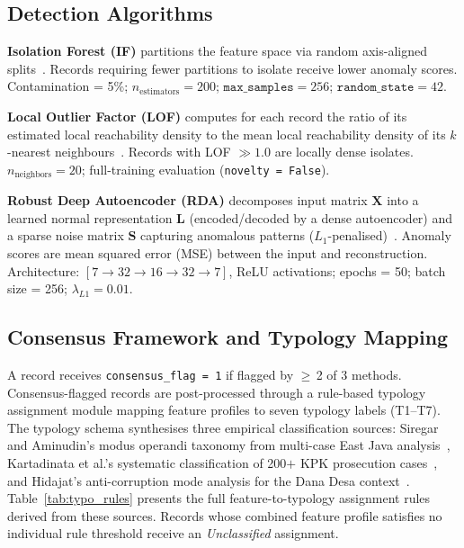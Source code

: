 \documentclass[3p,times,procedia]{elsarticle}
\begin{document}
\subsection{Detection Algorithms}

\textbf{Isolation Forest (IF)} partitions the feature space via random axis-aligned splits~\cite{ref19,ref20}. Records requiring fewer partitions to isolate receive lower anomaly scores. Contamination = 5\%; $n_{\text{estimators}} = 200$; $\texttt{max\_samples} = 256$; $\texttt{random\_state} = 42$.

\textbf{Local Outlier Factor (LOF)} computes for each record the ratio of its estimated local reachability density to the mean local reachability density of its $k$-nearest neighbours~\cite{ref25}. Records with LOF $\gg 1.0$ are locally dense isolates. $n_{\text{neighbors}} = 20$; full-training evaluation (\texttt{novelty = False}).

\textbf{Robust Deep Autoencoder (RDA)} decomposes input matrix $\mathbf{X}$ into a learned normal representation $\mathbf{L}$ (encoded/decoded by a dense autoencoder) and a sparse noise matrix $\mathbf{S}$ capturing anomalous patterns ($L_1$-penalised)~\cite{ref34}. Anomaly scores are mean squared error (MSE) between the input and reconstruction. Architecture: $[7 \to 32 \to 16 \to 32 \to 7]$, ReLU activations; epochs = 50; batch size = 256; $\lambda_{L1} = 0.01$.

\subsection{Consensus Framework and Typology Mapping}

A record receives \texttt{consensus\_flag = 1} if flagged by $\geq$\,2 of 3 methods. Consensus-flagged records are post-processed through a rule-based typology assignment module mapping feature profiles to seven typology labels (T1--T7). The typology schema synthesises three empirical classification sources: Siregar and Aminudin's modus operandi taxonomy from multi-case East Java analysis~\cite{ref13}, Kartadinata et al.'s systematic classification of 200$+$ KPK prosecution cases~\cite{ref14}, and Hidajat's anti-corruption mode analysis for the Dana Desa context~\cite{ref6}. Table~\ref{tab:typo_rules} presents the full feature-to-typology assignment rules derived from these sources. Records whose combined feature profile satisfies no individual rule threshold receive an \textit{Unclassified} assignment.
\end{document}
